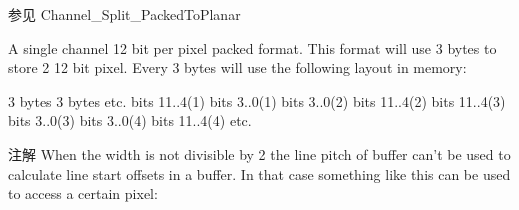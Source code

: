 \begin{Desc}
\begin{description}
\begin{DoxySeeAlso}{参见}
Channel\+\_\+\+Split\+\_\+\+Packed\+To\+Planar 
\end{DoxySeeAlso}
\item[{\em 
\hypertarget{group___common_interface_gga456e8aa76e06bb761f27c52141475985a65bb8f8d5c88edfcfaa2c3a73bcb8cd9}{ibpf\+Mono12\+Packed\+\_\+\+V2}\label{group___common_interface_gga456e8aa76e06bb761f27c52141475985a65bb8f8d5c88edfcfaa2c3a73bcb8cd9}
}]A single channel 12 bit per pixel packed format. This format will use 3 bytes to store 2 12 bit pixel. Every 3 bytes will use the following layout in memory\+:


\begin{DoxyCode}
3 bytes                                               3 bytes                                              
       etc.
bits 11..4(1) bits 3..0(1) bits 3..0(2) bits 11..4(2) bits 11..4(3) bits 3..0(3) bits 3..0(4) bits 11..4(4)
       etc.
\end{DoxyCode}


\begin{DoxyNote}{注解}
When the width is not divisible by 2 the line pitch of buffer can't be used to calculate line start offsets in a buffer. In that case something like this can be used to access a certain pixel\+:
\end{DoxyNote}


\end{description}
\end{Desc}
